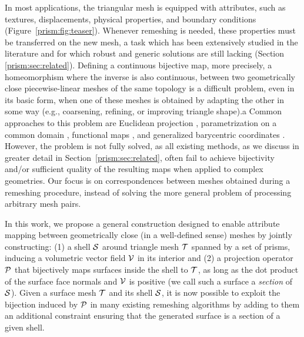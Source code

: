 In most applications, the triangular mesh is equipped with attributes, such as textures, displacements, physical properties, and boundary conditions (Figure~\ref{prism:fig:teaser}). Whenever remeshing is needed, these properties must be transferred on the new mesh, a task which has been extensively studied in the literature and for which robust and generic solutions are still lacking (Section \ref{prism:sec:related}). 
Defining a {continuous} bijective map, {more precisely, a homeomorphism where the inverse is also continuous,} between two {geometrically close}  piecewise-linear meshes of the same topology is a difficult problem, even in its basic form, when one of these meshes is obtained by adapting the other in some way (e.g., coarsening, refining, or improving triangle shape).a
Common approaches to this problem are Euclidean projection
\cite{jiao2004overlaying}, parametrization on a common domain \cite{praun2001consistent,kraevoy2004cross,lee1998maps}, functional maps \cite{Ovsjanikov:2012}, and generalized barycentric coordinates \cite{Hormann:2017:GBC}.  However, the problem is not fully solved, as all existing methods, as we discuss in greater detail in Section~\ref{prism:sec:related},
 often fail to achieve bijectivity and/or sufficient quality of the resulting maps when applied to complex geometries. %
{Our focus is on correspondences between meshes obtained during a remeshing procedure, instead of solving the more general problem of processing arbitrary mesh pairs.}

In this work, we propose a general construction designed to enable attribute mapping between geometrically close (in a well-defined sense) meshes by jointly constructing: (1) a shell $\S$ around triangle mesh $\T$ spanned by a set of prisms, inducing a volumetric vector field $\V$ in its interior and (2) a projection operator $\P$ that bijectively maps surfaces inside the shell to $\T$, as long as the dot product of the surface face normals and $\V$ is positive
(we call such a surface a \emph{section} of $\S$).
Given a surface mesh $\T$ and its shell $\S$, it is now possible to exploit the bijection induced by $\P$ in many existing remeshing algorithms by adding to them an additional constraint ensuring that the generated surface is a section of a given shell.

